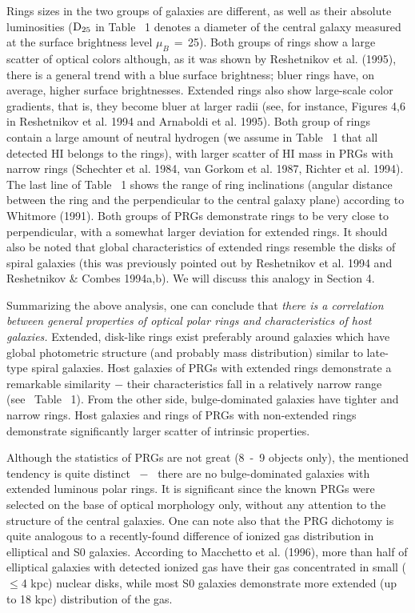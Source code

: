 Rings sizes in the two groups of galaxies are different,  
as well as their absolute luminosities ($\rm D_{25}$ in Table~ 1 
denotes a diameter of the central galaxy measured at the surface brightness 
level $\mu_{B}\,=\,$25). 
Both groups of rings show a large scatter 
of optical colors although, as it was shown by 
Reshetnikov et al. (1995), there is a general trend with a blue 
surface brightness; bluer rings have, on average, 
higher surface brightnesses. Extended rings also show large-scale 
color gradients, that is, they become bluer at larger radii 
(see, for instance,  Figures 4,6 in Reshetnikov et al. 1994 and 
Arnaboldi et al. 1995). Both group of rings contain a large amount 
of neutral hydrogen (we assume in Table~ 1 that all detected HI 
belongs to the rings), with larger scatter of HI mass in PRGs with 
narrow rings (Schechter et al. 1984, van Gorkom et al. 1987, 
Richter et al. 1994). The last line of Table~ 1 shows the range of ring 
inclinations (angular distance between the ring and the perpendicular
to the central galaxy plane) according to Whitmore 
(1991). Both groups of PRGs demonstrate rings to be very close to 
perpendicular, with a somewhat larger deviation for extended rings.
It should also be noted that global characteristics of extended
rings resemble the disks of spiral galaxies (this was
previously pointed out by Reshetnikov et al. 1994 and Reshetnikov \&
Combes 1994a,b). We will discuss this analogy in Section 4.  

Summarizing the above analysis, one can conclude that
{\it there is a correlation between general properties
of optical polar rings and characteristics of host galaxies.}
Extended, disk-like rings exist preferably around galaxies
which have global photometric structure (and probably mass
distribution) similar to late-type spiral galaxies. Host
galaxies of PRGs with extended rings demonstrate a remarkable
similarity $-$ their characteristics fall in a relatively
narrow range (see~ Table~ 1). From the other side, bulge-dominated
galaxies have tighter and narrow rings. Host galaxies and rings 
of PRGs with non-extended rings demonstrate significantly larger
scatter of intrinsic properties. 

Although the statistics of
PRGs are not great (8~-~9 objects only), the mentioned tendency
is quite distinct~ $-$~ there are no bulge-dominated galaxies
with extended luminous polar rings. It is significant since the
known PRGs were selected on the base of optical morphology only,
without any attention to the structure of the central galaxies.
One can note also that
the PRG dichotomy is quite analogous to a recently-found
difference of ionized gas distribution in elliptical and S0
galaxies. According to Macchetto et al. (1996), more than half
of elliptical galaxies with detected ionized gas have their gas concentrated
in small ($\leq$4 kpc) nuclear disks, while most S0 galaxies
demonstrate more extended (up to 18 kpc) distribution of the gas.   

